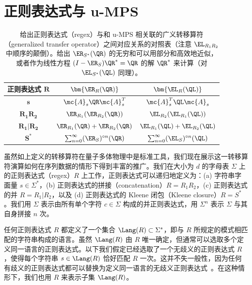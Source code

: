 \section{正则表达式与 u-MPS}
\label{sec:regex}
%
\begin{table}[t]
\setlength\aboverulesep{0.1pt}
\setlength\belowrulesep{0.1pt}
\renewcommand{\arraystretch}{1.7}
\caption{给出正则表达式（regex）与和 u-MPS 相关联的广义转移算符（generalized transfer operator）之间对应关系的对照表（注意 $\EL_{R_1 R_2}$ 中顺序的颠倒）。给出 $\ER_{S^*}(\QR)$ 的无穷和可以用部分和高效地近似，或者作为线性方程 $(I - \ER_S)\QR^* = \QR$ 的解 $\QR^*$ 来计算（对 $\EL_{S^*}(\QL)$ 同理）。}
\label{tab:regex_cp}
\begin{center}
\begin{small}
\begin{sc}
\begin{tabular}{c|c|c}
    \textbf{正则表达式} $\mathbf{R}$ & $\bm{\ER_R(\QR)}$ & $\bm{\EL_R(\QL)}$ \\
    \midrule
    $\mathbf{s}$ &         $\mc{A}_s \QR \mc{A}_s^T$                             & $\mc{A}_s^T \QL \mc{A}_s$ \\
    $\mathbf{R_1 R_2}$ &   $\ER_{R_1}(\ER_{R_2}(\QR))$                           & $\EL_{R_2}(\EL_{R_1}(\QL))$ \\
    $\mathbf{R_1 | R_2}$ & $\ER_{R_1}(\QR) + \ER_{R_2}(\QR)$                     & $\EL_{R_1}(\QL) + \EL_{R_2}(\QL)$ \\
    $\mathbf{S^*}$ &       $\sum_{n=0}^\infty (\ER_S)^{\circ n}(\QR)$ & $\sum_{n=0}^\infty (\EL_S)^{\circ n}(\QL)$
\end{tabular}
\end{sc}
\end{small}
\end{center}
\vskip -0.1in
\end{table}
%
虽然如上定义的转移算符在量子多体物理中是标准工具，我们现在展示这一转移算符演算如何在序列数据的情形下得到丰富的推广。我们在大小为 $d$ 的字母表 $\Sigma$ 上的正则表达式（regex）$R$ 上工作，正则表达式可以递归地定义为：(a) 字符串字面量 $s\in\Sigma^*$，(b) 正则表达式的拼接（concatenation）$R = R_1 R_2$，(c) 正则表达式的并 $R = R_1 | R_2$，以及 (d) 正则表达式的 Kleene 闭包（Kleene closure）$R = S^*$。我们用 $\Sigma$ 表示由所有单个字符 $c \in \Sigma$ 构成的并正则表达式，用 $\Sigma^n$ 表示 $\Sigma$ 与其自身拼接 $n$ 次。

任何正则表达式 $R$ 都定义了一个集合 $\Lang(R) \subset \Sigma^*$，即与 $R$ 所规定的模式相匹配的字符串构成的语言。虽然 $\Lang(R)$ 由 $R$ 唯一确定，但通常可以选取多个定义同一语言的正则表达式。以下我们假定已经选取了一个无歧义的正则表达式 $R$，使得每个字符串 $s \in \Lang(R)$ 恰好匹配 $R$ 一次。这并不失一般性，因为任何有歧义的正则表达式都可以替换为定义同一语言的无歧义正则表达式~\citep{book1971}。在这种情形下，我们也用 $R$ 来表示子集 $\Lang(R)$。

